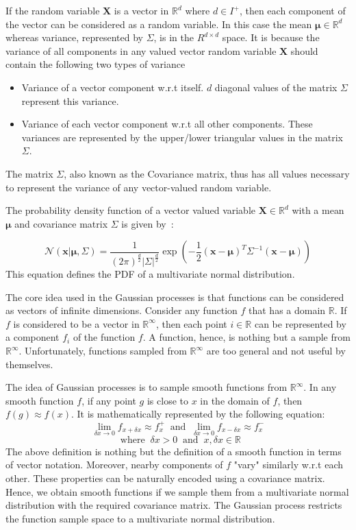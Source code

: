 \documentclass[12pt, twoside, ngerman]{report}
\begin{document}
If the random variable $\textbf{X}$ is a vector in $\mathbb{R}^d$ where $d \in I^{+}$,  then each component of the vector can be considered as a random variable.
In this case the mean $\boldsymbol{\mu} \in \mathbb{R}^d$ whereas variance, represented by $\Sigma$, is in the $R^{d \times d}$ space.
It is because the variance of all components in any valued vector random variable $\textbf{X}$ should contain the following two types of variance
\begin{itemize}
\item Variance of a vector component w.r.t itself.
$d$ diagonal values of the matrix $\Sigma$ represent this variance.
\item Variance of each vector component w.r.t all other components. These variances are represented by the upper/lower triangular values in the matrix $\Sigma$.
\end{itemize}
The matrix $\Sigma$, also known as the Covariance matrix, thus has all values necessary to represent the variance of any vector-valued random variable.


The probability density function of a vector valued variable $\textbf{X} \in \mathbb{R}^d$ with a mean $\boldsymbol{\mu}$ and covariance matrix $\Sigma$ is given by~\cite{MITMLBook}:

$$
\mathcal{N}(\textbf{x} | \boldsymbol{\mu},  \Sigma) = 
\frac{1}{(2\pi)^{\frac{d}{2}} |\Sigma|^{\frac{d}{2}}}
\exp\left( - \frac{1}{2} (\textbf{x} - \boldsymbol{\mu})^T  \Sigma^{-1}   (\textbf{x} - \boldsymbol{\mu}) \right)
$$
This equation defines the PDF of a multivariate normal distribution.

The core idea used in the Gaussian processes is that functions can be considered as vectors of infinite dimensions.
Consider any function $f$ that has a domain $\mathbb{R}$.
If $f$ is considered to be a vector in $\mathbb{R}^{\infty}$,
then each point $i \in \mathbb{R}$  can be represented by a component $f_i$ of the function $f$.
A function,  hence,  is nothing but a sample from $\mathbb{R}^{\infty}$.
Unfortunately, functions sampled from $\mathbb{R}^{\infty}$ are too general and not useful by themselves.

The idea of Gaussian processes is to sample smooth functions from $\mathbb{R}^{\infty}$.
In any smooth function $f$, if any point $g$ is close to $x$ in the domain of $f$, then $f(g) \approx f(x)$.
It is mathematically represented by the following equation:
$$
\lim_{\delta x \to 0} f_{x + \delta x} \approx f^{+}_x  \;\; \textrm{and} \;\; 
\lim_{\delta x \to 0} f_{x - \delta x} \approx f^{-}_x 
$$
$$\;\; \textrm{where} \;\; \delta x > 0 \;\; \textrm{and} \;\; x, \delta x \in \mathbb{R}
$$
The above definition is nothing but the definition of a smooth function in terms of vector notation. 
Moreover, nearby components of $f$ "vary" similarly w.r.t each other.
These properties can be naturally encoded using a covariance matrix.
Hence, we obtain smooth functions if we sample them from a multivariate normal distribution with the required covariance matrix.
The Gaussian process restricts the function sample space to a multivariate normal distribution.
\end{document}

